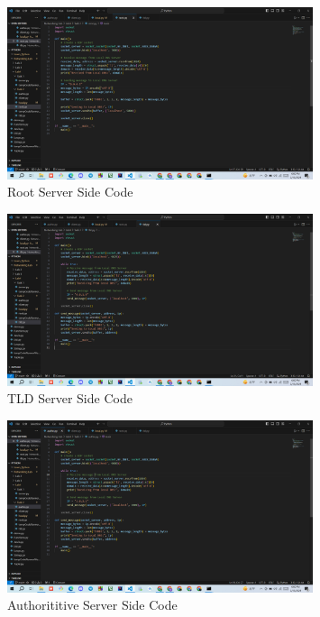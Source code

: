 \documentclass[11pt]{article}
\begin{document}
\begin{itemize}
\begin{itemize}
    \begin{figure}[H]
      \centering
      \includegraphics[width=0.8\textwidth]{Screenshot (166).png}
      \caption{Root Server Side Code}
      \label{fig:3}
    \end{figure}
    
    \begin{figure}[H]
      \centering
      \includegraphics[width=0.8\textwidth]{Screenshot (167).png}
      \caption{TLD Server Side Code}
      \label{fig:4}
    \end{figure}


    \begin{figure}[H]
      \centering
      \includegraphics[width=0.8\textwidth]{Screenshot (168).png}
      \caption{Authorititive Server Side Code}
      \label{fig:4}
    \end{figure}




\end{itemize}
\end{itemize}
\end{document}
